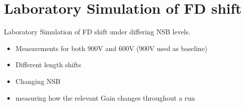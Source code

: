\chapter{Laboratory Simulation of FD shift}\label{Ch:LabPMTshift}

Laboratory Simulation of FD shift under differing NSB levels.
\begin{itemize}
\item Measurements for both 900V and 600V (900V used as baseline)
\item Different length shifts
\item Changing NSB
\item measuring how the relevant Gain changes throughout a run
\end{itemize}